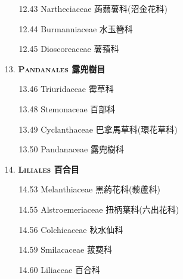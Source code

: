 \begin{enumerate}
    \begin{enumerate}
      \item[12.43] Nartheciaceae 蒟蒻薯科(沼金花科)     
        
      \item[12.44] Burmanniaceae 水玉簪科     
        
      \item[12.45] Dioscoreaceae 薯蕷科     
        
    \end{enumerate}
  \item[13. ] \textbf{\textsc{Pandanales} 露兜樹目}   
    \begin{enumerate}
      \item[13.46] Triuridaceae 霉草科     
        
      \item[13.48] Stemonaceae 百部科     
        
      \item[13.49] Cyclanthaceae 巴拿馬草科(環花草科)     
        
      \item[13.50] Pandanaceae 露兜樹科     
        
    \end{enumerate}
  \item[14. ] \textbf{\textsc{Liliales} 百合目}   
    \begin{enumerate}
      \item[14.53] Melanthiaceae 黑葯花科(藜蘆科)     
        
      \item[14.55] Alstroemeriaceae 扭柄葉科(六出花科)     
        
      \item[14.56] Colchicaceae 秋水仙科     
        
      \item[14.59] Smilacaceae 菝葜科     
        
      \item[14.60] Liliaceae 百合科     
        
    \end{enumerate}

\end{enumerate}
